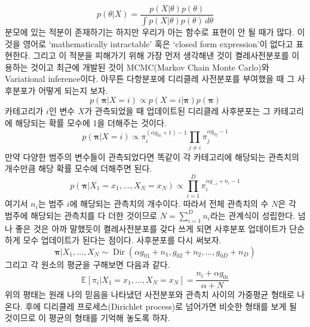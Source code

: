 \documentclass[a4paper, 10pt]{book}
\newcommand{\bs}{\boldsymbol}
\newcommand{\opn}{\operatorname}
\begin{document}
\begin{equation}
  p\left(\theta|X\right) = \frac{p\left(X|\theta\right)p\left(\theta\right)}{\int p\left(X|\theta\right)p\left(\theta\right)\,d\theta}
\end{equation}
분모에 있는 적분이 존재하기는 하지만 우리가 아는 함수로 표현이 안 될 때가 많다. 이것을 영어로 `mathematically intractable' 혹은 `closed form expression'이 없다고 표현한다. 그리고 이 적분을 피해가기 위해 가장 먼저 생각해낸 것이 켤레사전분포를 이용하는 것이고 최근에 개발된 것이 MCMC(Markov Chain Monte Carlo)와 Variational inference이다. 아무튼 다항분포에 디리클레 사전분포를 부여했을 때 그 사후분포가 어떻게 되는지 보자.
\begin{equation}
  p\left(\bs{\pi}|X=i\right) \propto p\left(X=i|\bs{\pi}\right)p\left(\bs{\pi}\right)
\end{equation}
카테고리가 $i$인 변수 $X$가 관측되었을 때 업데이트된 디리클레 사후분포는 그 카테고리에 해당되는 확률 모수에 1을 더해주는 것이다.
\begin{equation}
  p\left(\bs{\pi}|X=i\right)\propto \pi_{i}^{\left(\alpha g_{0i}+1\right)-1}\prod_{j\neq i}\pi_{j}^{\alpha g_{0j}-1}
\end{equation}
만약 다양한 범주의 변수들이 관측되었다면 똑같이 각 카테고리에 해당되는 관측치의 개수만큼 해당 확률 모수에 더해주면 된다.
\begin{equation}
  p\left(\bs{\pi}|X_{1}=x_{1}, \ldots, X_{N}=x_{N}\right)\propto \prod_{i=1}^{D}\pi_{i}^{\alpha g_{-i}+n_{i}-1}
\end{equation}
여기서 $n_{i}$는 범주 $i$에 해당되는 관측치의 개수이다. 따라서 전체 관측치의 수 $N$은 각 범주에 해당되는 관측치를 다 더한 것이므로 $N=\sum_{i=1}^{D}n_{i}$라는 관계식이 성립한다. 넘나 좋은 것은 아까 말했듯이 켤레사전분포를 갖다 쓰게 되면 사후분포 업데이트가 단순하게 모수 업데이트가 된다는 점이다. 사후분포를 다시 써보자.
\begin{equation}
  \bs{\pi}|X_{1},\ldots ,X_{N}\sim \opn{Dir}\left(\alpha g_{01}+n_{1}, g_{02}+n_{2}, \ldots , g_{0D}+n_{D}\right)
\end{equation}
그리고 각 원소의 평균을 구해보면 다음과 같다.
\begin{equation}
  \mathbb{E}\left[\pi_{i}|X_{1}=x_{1},\ldots , X_{N}=x_{N}\right] = \frac{n_{i}+\alpha g_{0i}}{\alpha + N}
\end{equation}
위의 평태는 원래 나의 믿음을 나타냈던 사전분포와 관측치 사이의 가중평균 형태로 나온다. 후에 디리클레 프로세스(Dirichlet process)로 넘어가면 비슷한 형태를 보게 될 것이므로 이 평균의 형태를 기억해 놓도록 하자.
\end{document}
